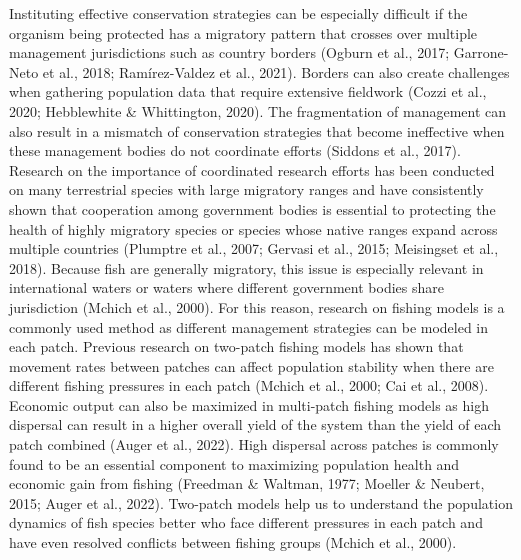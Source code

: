 \documentclass[
  12pt,
]{article}
\begin{document}
Instituting effective conservation strategies can be especially difficult if the organism being protected has a migratory pattern that crosses over multiple management jurisdictions such as country borders (Ogburn et al., 2017; Garrone-Neto et al., 2018; Ramírez-Valdez et al., 2021). Borders can also create challenges when gathering population data that require extensive fieldwork (Cozzi et al., 2020; Hebblewhite \& Whittington, 2020). The fragmentation of management can also result in a mismatch of conservation strategies that become ineffective when these management bodies do not coordinate efforts (Siddons et al., 2017). Research on the importance of coordinated research efforts has been conducted on many terrestrial species with large migratory ranges and have consistently shown that cooperation among government bodies is essential to protecting the health of highly migratory species or species whose native ranges expand across multiple countries (Plumptre et al., 2007; Gervasi et al., 2015; Meisingset et al., 2018). Because fish are generally migratory, this issue is especially relevant in international waters or waters where different government bodies share jurisdiction (Mchich et al., 2000). For this reason, research on fishing models is a commonly used method as different management strategies can be modeled in each patch. Previous research on two-patch fishing models has shown that movement rates between patches can affect population stability when there are different fishing pressures in each patch (Mchich et al., 2000; Cai et al., 2008). Economic output can also be maximized in multi-patch fishing models as high dispersal can result in a higher overall yield of the system than the yield of each patch combined (Auger et al., 2022). High dispersal across patches is commonly found to be an essential component to maximizing population health and economic gain from fishing (Freedman \& Waltman, 1977; Moeller \& Neubert, 2015; Auger et al., 2022). Two-patch models help us to understand the population dynamics of fish species better who face different pressures in each patch and have even resolved conflicts between fishing groups (Mchich et al., 2000).
\end{document}
